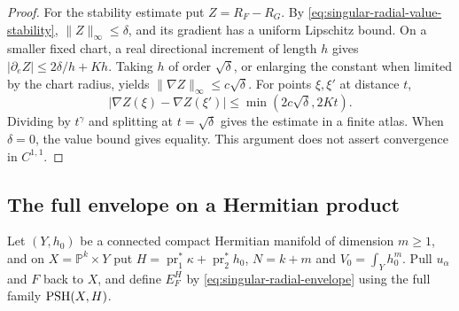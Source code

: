 \begin{proof}
For the stability estimate put $Z=R_F-R_G$. By \eqref{eq:singular-radial-value-stability}, $\|Z\|_\infty\leq\delta$, and its gradient has a uniform Lipschitz bound. On a smaller fixed chart, a real directional increment of length $h$ gives
$|\partial_e Z|\leq2\delta/h+Kh$. Taking $h$ of order $\sqrt\delta$, or enlarging the constant when limited by the chart radius, yields $\|\nabla Z\|_\infty\leq c\sqrt\delta$. For points $\xi,\xi'$ at distance $t$,
\[
 |\nabla Z(\xi)-\nabla Z(\xi')|\leq\min(2c\sqrt\delta,2Kt).
\]
Dividing by $t^\gamma$ and splitting at $t=\sqrt\delta$ gives the estimate in a finite atlas. When $\delta=0$, the value bound gives equality. This argument does not assert convergence in $C^{1,1}$.
\end{proof}

\subsection{The full envelope on a Hermitian product}
Let $(Y,h_0)$ be a connected compact Hermitian manifold of dimension $m\geq1$, and on $X=\mathbb P^k\times Y$ put
$H=\operatorname{pr}_1^*\kappa+\operatorname{pr}_2^*h_0$, $N=k+m$ and $V_0=\int_Yh_0^m$. Pull $u_\alpha$ and $F$ back to $X$, and define $E_F^H$ by \eqref{eq:singular-radial-envelope} using the full family $\mathrm{PSH}(X,H)$.

